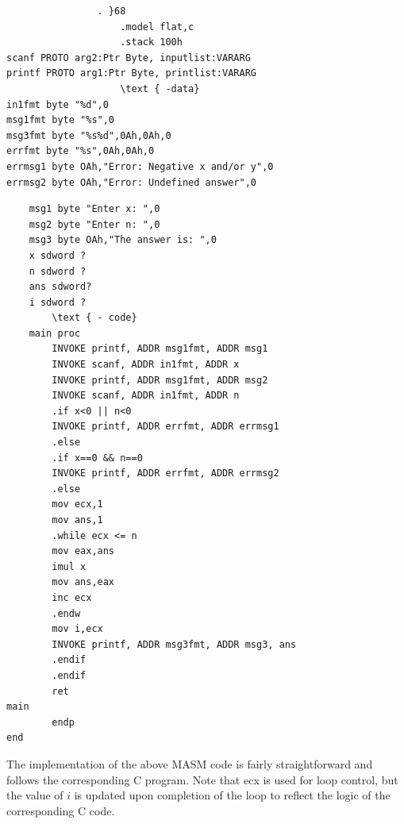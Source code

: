 \documentclass[10pt]{article}
\begin{document}
\begin{verbatim}
                . }68
                    .model flat,c
                    .stack 100h
scanf PROTO arg2:Ptr Byte, inputlist:VARARG
printf PROTO arg1:Ptr Byte, printlist:VARARG
                    \text { -data}
in1fmt byte "%d",0
msg1fmt byte "%s",0
msg3fmt byte "%s%d",0Ah,0Ah,0
errfmt byte "%s",0Ah,0Ah,0
errmsg1 byte OAh,"Error: Negative x and/or y",0
errmsg2 byte OAh,"Error: Undefined answer",0
\end{verbatim}

\begin{verbatim}
    msg1 byte "Enter x: ",0
    msg2 byte "Enter n: ",0
    msg3 byte OAh,"The answer is: ",0
    x sdword ?
    n sdword ?
    ans sdword?
    i sdword ?
        \text { - code}
    main proc
        INVOKE printf, ADDR msg1fmt, ADDR msg1
        INVOKE scanf, ADDR in1fmt, ADDR x
        INVOKE printf, ADDR msg1fmt, ADDR msg2
        INVOKE scanf, ADDR in1fmt, ADDR n
        .if x<0 || n<0
        INVOKE printf, ADDR errfmt, ADDR errmsg1
        .else
        .if x==0 && n==0
        INVOKE printf, ADDR errfmt, ADDR errmsg2
        .else
        mov ecx,1
        mov ans,1
        .while ecx <= n
        mov eax,ans
        imul x
        mov ans,eax
        inc ecx
        .endw
        mov i,ecx
        INVOKE printf, ADDR msg3fmt, ADDR msg3, ans
        .endif
        .endif
        ret
main
        endp
end
\end{verbatim}

The implementation of the above MASM code is fairly straightforward and follows the corresponding C program. Note that ecx is used for loop control, but the value of $i$ is updated upon completion of the loop to reflect the logic of the corresponding C code.
\end{document}
